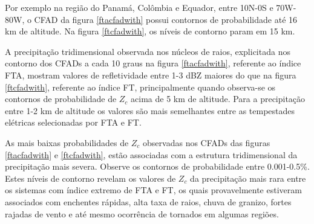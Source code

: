 
Por exemplo na região do Panamá, Colômbia e Equador, entre 10N-0S e 70W-80W, o CFAD da figura \ref{ftacfadwith} possui contornos de probabilidade até 16 km de altitude. Na figura \ref{ftcfadwith}, os níveis de contorno param em 15 km.

A precipitação tridimensional observada nos núcleos de raios, explicitada nos contorno dos CFADs a cada 10 graus na figura \ref{ftacfadwith}, referente ao índice FTA, mostram valores de refletividade entre 1-3 dBZ maiores do que na figura \ref{ftcfadwith}, referente ao índice FT, principalmente quando observa-se os contornos de probabilidade de $Z_c$ acima de 5 km de altitude. Para a precipitação entre 1-2 km de altitude os valores são mais semelhantes entre as tempestades elétricas selecionadas por FTA e FT. 


As mais baixas probabilidades de $Z_c$ observadas nos CFADs das figuras \ref{ftacfadwith} e \ref{ftcfadwith}, estão associadas com a estrutura tridimensional da precipitação mais severa. Observe os contornos de probabilidade entre 0.001-0.5\%. Estes níveis de contorno revelam os valores de $Z_c$ da precipitação mais rara entre os sistemas com índice extremo de FTA e FT, os quais provavelmente estiveram associados com enchentes rápidas, alta taxa de raios, chuva de granizo, fortes rajadas de vento e até mesmo ocorrência de tornados em algumas regiões. 


